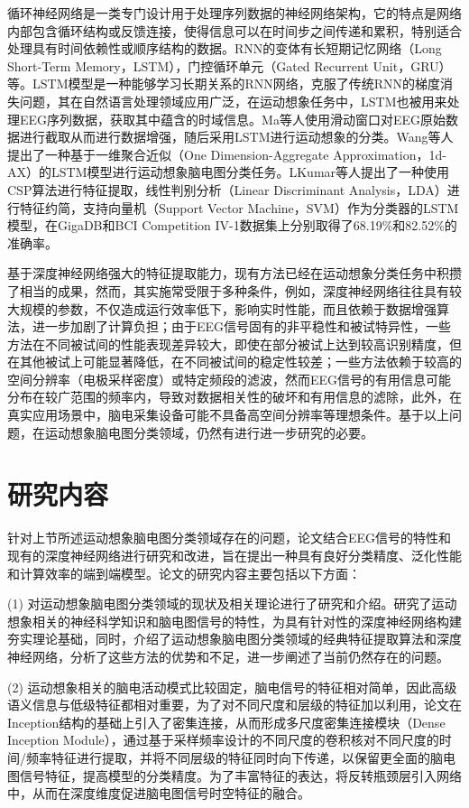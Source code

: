 循环神经网络是一类专门设计用于处理序列数据的神经网络架构，它的特点是网络内部包含循环结构或反馈连接，使得信息可以在时间步之间传递和累积，特别适合处理具有时间依赖性或顺序结构的数据。RNN的变体有长短期记忆网络（Long Short-Term Memory，LSTM），门控循环单元（Gated Recurrent Unit，GRU）等。LSTM模型是一种能够学习长期关系的RNN网络，克服了传统RNN的梯度消失问题，其在自然语言处理领域应用广泛，在运动想象任务中，LSTM也被用来处理EEG序列数据，获取其中蕴含的时域信息。Ma等人\cite{ma2018improving}使用滑动窗口对EEG原始数据进行截取从而进行数据增强，随后采用LSTM进行运动想象的分类。Wang等人\cite{wang2018lstm}提出了一种基于一维聚合近似（One Dimension-Aggregate Approximation，1d-AX）的LSTM模型进行运动想象脑电图分类任务。LKumar等人\cite{kumar2019brain}提出了一种使用CSP算法进行特征提取，线性判别分析（Linear Discriminant Analysis，LDA）进行特征约简，支持向量机（Support Vector Machine，SVM）作为分类器的LSTM模型，在GigaDB\cite{cho2017eeg}和BCI Competition IV-1\cite{blankertz2007non}数据集上分别取得了68.19\%和82.52\%的准确率。

基于深度神经网络强大的特征提取能力，现有方法已经在运动想象分类任务中积攒了相当的成果，然而，其实施常受限于多种条件，例如，深度神经网络往往具有较大规模的参数，不仅造成运行效率低下，影响实时性能，而且依赖于数据增强算法，进一步加剧了计算负担；由于EEG信号固有的非平稳性和被试特异性，一些方法在不同被试间的性能表现差异较大，即使在部分被试上达到较高识别精度，但在其他被试上可能显著降低，在不同被试间的稳定性较差；一些方法依赖于较高的空间分辨率（电极采样密度）或特定频段的滤波，然而EEG信号的有用信息可能分布在较广范围的频率内，导致对数据相关性的破坏和有用信息的滤除，此外，在真实应用场景中，脑电采集设备可能不具备高空间分辨率等理想条件。基于以上问题，在运动想象脑电图分类领域，仍然有进行进一步研究的必要。

\section{研究内容}

针对上节所述运动想象脑电图分类领域存在的问题，论文结合EEG信号的特性和现有的深度神经网络进行研究和改进，旨在提出一种具有良好分类精度、泛化性能和计算效率的端到端模型。论文的研究内容主要包括以下方面：

(1) 对运动想象脑电图分类领域的现状及相关理论进行了研究和介绍。研究了运动想象相关的神经科学知识和脑电图信号的特性，为具有针对性的深度神经网络构建夯实理论基础，同时，介绍了运动想象脑电图分类领域的经典特征提取算法和深度神经网络，分析了这些方法的优势和不足，进一步阐述了当前仍然存在的问题。

(2) 运动想象相关的脑电活动模式比较固定，脑电信号的特征相对简单，因此高级语义信息与低级特征都相对重要，为了对不同尺度和层级的特征加以利用，论文在Inception结构的基础上引入了密集连接，从而形成多尺度密集连接模块（Dense Inception Module），通过基于采样频率设计的不同尺度的卷积核对不同尺度的时间/频率特征进行提取，并将不同层级的特征同时向下传递，以保留更全面的脑电图信号特征，提高模型的分类精度。为了丰富特征的表达，将反转瓶颈层引入网络中，从而在深度维度促进脑电图信号时空特征的融合。

